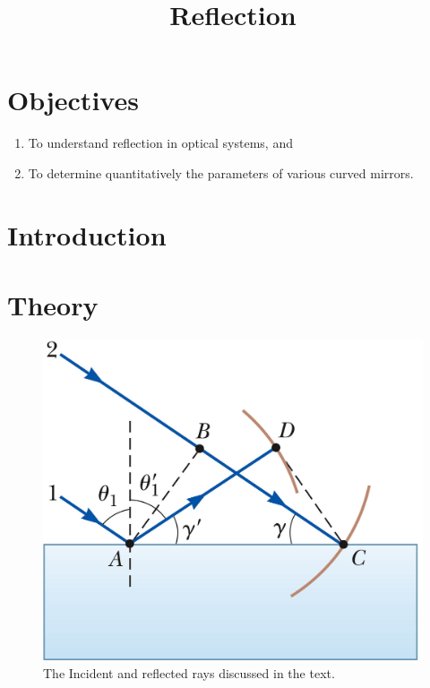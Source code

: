 \documentclass[12pt]{article}
\title{Reflection}
\author{}
\date{}
\begin{document}
\maketitle

\section{Objectives}
\label{sec:objectives}

\begin{enumerate}
\item To understand reflection in optical systems, and
\item To determine quantitatively the parameters of various curved
  mirrors. 
\end{enumerate}

\section{Introduction}
\label{sec:introduction}


\section{Theory}
\label{sec:theory}

\begin{figure}
  \centering
  \includegraphics[width=\textwidth/2]{figures/3519}  
  \caption{The Incident and reflected rays discussed in the text.}
  \label{fig:defs}
\end{figure}
\end{document}
